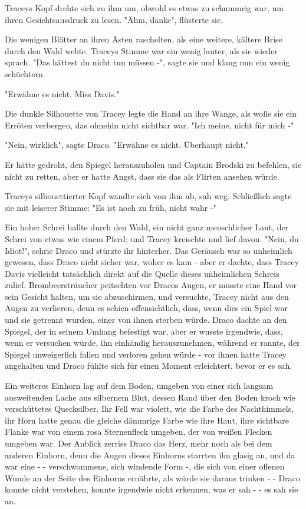 {Traceys Kopf drehte sich zu ihm um, obwohl es etwas zu schummrig war, um ihren Gesichtsausdruck zu lesen. "Ähm, danke", flüsterte sie.

Die wenigen Blätter an ihren Ästen raschelten, als eine weitere, kältere Brise durch den Wald wehte. Traceys Stimme war ein wenig lauter, als sie wieder sprach. "Das hättest du nicht tun müssen -", sagte sie und klang nun ein wenig schüchtern.

"Erwähne es nicht, Miss Davis."

Die dunkle Silhouette von Tracey legte die Hand an ihre Wange, als wolle sie ein Erröten verbergen, das ohnehin nicht sichtbar war. "Ich meine, nicht für mich -"

"Nein, wirklich", sagte Draco. "Erwähne es nicht. Überhaupt nicht."

Er hätte gedroht, den Spiegel herauszuholen und Captain Brodski zu befehlen, sie nicht zu retten, aber er hatte Angst, dass sie das als Flirten ansehen würde.

Traceys silhouettierter Kopf wandte sich von ihm ab, sah weg. Schließlich sagte sie mit leiserer Stimme: "Es ist noch zu früh, nicht wahr -"

Ein hoher Schrei hallte durch den Wald, ein nicht ganz menschlicher Laut, der Schrei von etwas wie einem Pferd; und Tracey kreischte und lief davon. "Nein, du Idiot!", schrie Draco und stürzte ihr hinterher. Das Geräusch war so unheimlich gewesen, dass Draco nicht sicher war, woher es kam - aber er dachte, dass Tracey Davis vielleicht tatsächlich direkt auf die Quelle dieses unheimlichen Schreis zulief. Brombeersträucher peitschten vor Dracos Augen, er musste eine Hand vor sein Gesicht halten, um sie abzuschirmen, und versuchte, Tracey nicht aus den Augen zu verlieren, denn es schien offensichtlich, dass, wenn dies ein Spiel war und sie getrennt wurden, einer von ihnen sterben würde. Draco dachte an den Spiegel, der in seinem Umhang befestigt war, aber er wusste irgendwie, dass, wenn er versuchen würde, ihn einhändig herauszunehmen, während er rannte, der Spiegel unweigerlich fallen und verloren gehen würde - vor ihnen hatte Tracey angehalten und Draco fühlte sich für einen Moment erleichtert, bevor er es sah.

Ein weiteres Einhorn lag auf dem Boden, umgeben von einer sich langsam ausweitenden Lache aus silbernem Blut, dessen Rand über den Boden kroch wie verschüttetes Quecksilber. Ihr Fell war violett, wie die Farbe des Nachthimmels, ihr Horn hatte genau die gleiche dämmrige Farbe wie ihre Haut, ihre sichtbare Flanke war von einem rosa Sternenfleck umgeben, der von weißen Flecken umgeben war. Der Anblick zerriss Draco das Herz, mehr noch als bei dem anderen Einhorn, denn die Augen dieses Einhorns starrten ihn glasig an, und da war eine - - verschwommene, sich windende Form -, die sich von einer offenen Wunde an der Seite des Einhorns ernährte, als würde sie daraus trinken - - Draco konnte nicht verstehen, konnte irgendwie nicht erkennen, was er sah - - es sah sie an.

}
